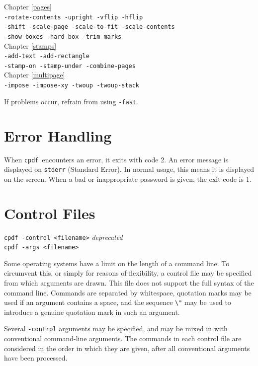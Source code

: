 \documentclass{book}
\newcommand{\cpdf}{\texttt{cpdf}}
\begin{document}
\begin{framed}
\small\noindent Chapter \ref{pages}\\
\noindent\small\verb!-rotate-contents -upright -vflip -hflip!\\
\small\verb!-shift -scale-page -scale-to-fit -scale-contents!\\
\small\verb!-show-boxes -hard-box -trim-marks!\\

\noindent Chapter \ref{stamps}\\
\noindent\small\verb!-add-text -add-rectangle!\\
\small\verb!-stamp-on -stamp-under -combine-pages!\\

\noindent Chapter \ref{multipage}\\
\noindent\verb!-impose -impose-xy -twoup -twoup-stack!
\end{framed}

\noindent If problems occur, refrain from using \verb!-fast!.

\section{Error Handling}
When \cpdf\ encounters an error, it exits with code 2. An error message is
displayed on \texttt{stderr} (Standard Error). In normal usage, this means it is
displayed on the screen. When a bad or inappropriate password is given, the exit code is 1.

\section{Control Files}
\begin{framed}
  \noindent\small\verb!cpdf -control <filename>! \textit{deprecated}\\
  \noindent\small\verb!cpdf -args <filename>!
\end{framed}

Some operating systems have a limit on the length of a command line. To
circumvent this, or simply for reasons of flexibility, a control file may be
specified from which arguments are drawn. This file does not support the full
syntax of the command line. Commands are separated by whitespace, quotation
marks may be used if an argument contains a space, and the sequence \verb!\"!
may be used to introduce a genuine quotation mark in such an argument.

Several \verb!-control! arguments may be specified, and may be mixed in with
conventional command-line arguments. The commands in each control file are
considered in the order in which they are given, after all conventional
arguments have been processed.
\end{document}
